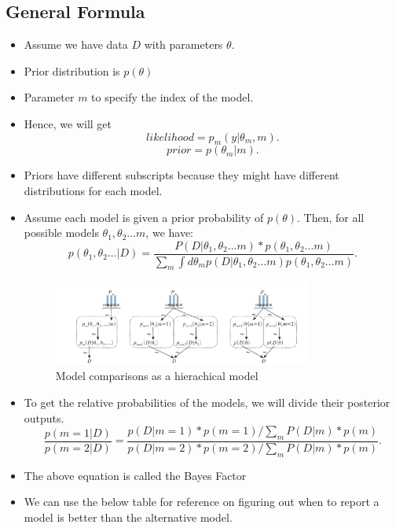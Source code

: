 \documentclass{article}
\begin{document}
\subsection{General Formula}
\begin{itemize}
    \item Assume we have data $D$ with parameters $\theta$.
    \item Prior distribution is $p(\theta)$
    \item Parameter  $m$ to specify the index of the model.
    \item Hence, we will get
        \[
            likelihood = p_{m}(y|\theta_{m}, m)
        .\] 
        \[
            prior = p(\theta_{m}|m) 
        .\]                 

    \item Priors have different subscripts because they might have different distributions for each model.
    \item Assume each model is given a prior probability of $p(\theta)$. Then, for all possible models $\theta_{1}, \theta_{2}\ldots m$, we have:
        \[
            p(\theta_{1}, \theta_{2} \ldots | D) = \frac{P(D | \theta_{1}, \theta_{2} \ldots m) * p(\theta_{1}, \theta_{2} \ldots m)}{\sum_{m} \int d\theta_{m}p(D| \theta_{1}, \theta_{2} \ldots m) p(\theta_{1}, \theta_{2} \ldots m)} 
        .\] 
        \begin{figure}[H]
            \centering
            \includegraphics[width=0.8\textwidth]{model_index}
            \caption{Model comparisons as a hierachical model}
            \label{fig:model_index}
        \end{figure} 
    \item To get the relative probabilities of the models, we will divide their posterior outputs.
        \[
            \frac{p(m=1 | D)}{p(m=2 | D)} = \frac{p(D | m = 1) * p(m=1) / \sum_{m}P(D|m) * p(m)}{p(D | m = 2) * p(m=2) /\sum_{m}P(D|m) * p(m)}
        .\] 
    \item The above equation is called the Bayes Factor
    \item We can use the below table for reference on figuring out when to report a model is better than the alternative model.

\end{itemize}
\end{document}
